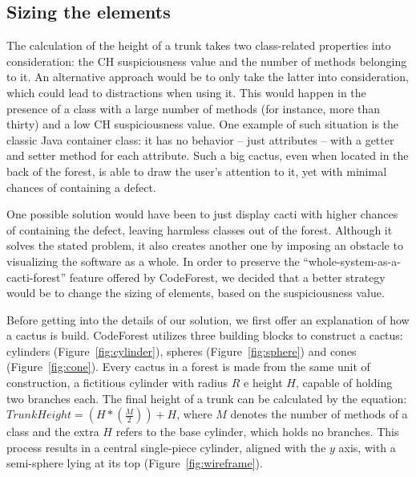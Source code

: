 \subsection{Sizing the elements}
The calculation of the height of a trunk takes two class-related properties into
consideration: the CH suspiciousness value and the number of methods belonging
to it. An alternative approach would be to only take the latter into consideration,
which could lead to distractions when using it. This would happen in the
presence of a class with a large number of methods (for instance, more than
thirty) and a low CH suspiciousness value. One example of such situation is the
classic Java container class: it has no behavior -- just attributes -- with a
getter and setter method for each attribute. Such a big cactus, even when
located in the back of the forest, is able to draw the user's attention to it,
yet with minimal chances of containing a defect.

One possible solution would have been to just display cacti with higher chances
of containing the defect, leaving harmless classes out of the forest. Although
it solves the stated problem, it also creates another one by imposing an
obstacle to visualizing the software as a whole. In order to preserve the
``whole-system-as-a-cacti-forest'' feature offered by CodeForest, we decided
that a better strategy would be to change the sizing of elements, based on the
suspiciousness value.

Before getting into the details of our solution, we first offer an explanation
of how a cactus is build. CodeForest utilizes three building blocks to construct
a cactus: cylinders (Figure~\ref{fig:cylinder}), spheres
(Figure~\ref{fig:sphere}) and cones (Figure~\ref{fig:cone}).
Every cactus in a forest is made from the same unit of construction, a
fictitious cylinder with radius $R$ e height $H$, capable of holding two
branches each.
The final height of a trunk can be calculated by the equation: $TrunkHeight = (H
* (\frac{M}{2})) + H$, where $M$ denotes the number of methods of a class and
the extra $H$ refers to the base cylinder, which holds no branches. This process
results in a central single-piece cylinder, aligned with the $y$ axis, with a
semi-sphere lying at its top (Figure~\ref{fig:wireframe}).

